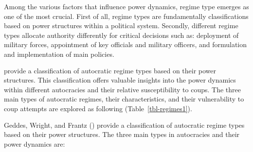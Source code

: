 \documentclass[
  12pt,
]{report}
\begin{document}
Among the various factors that influence power dynamics, regime type
emerges as one of the most crucial. First of all, regime types are
fundamentally classifications based on power structures within a
political system. Secondly, different regime types allocate authority
differently for critical decisions such as: deployment of military
forces, appointment of key officials and military officers, and
formulation and implementation of main policies.

provide a classification of autocratic regime types based on their power
structures. This classification offers valuable insights into the power
dynamics within different autocracies and their relative susceptibility
to coups. The three main types of autocratic regimes, their
characteristics, and their vulnerability to coup attempts are explored
as following (Table~\ref{tbl-regimes1}).

Geddes, Wright, and Frantz () provide a
classification of autocratic regime types based on their power
structures. The three main types in autocracies and their power dynamics
are:
\end{document}
